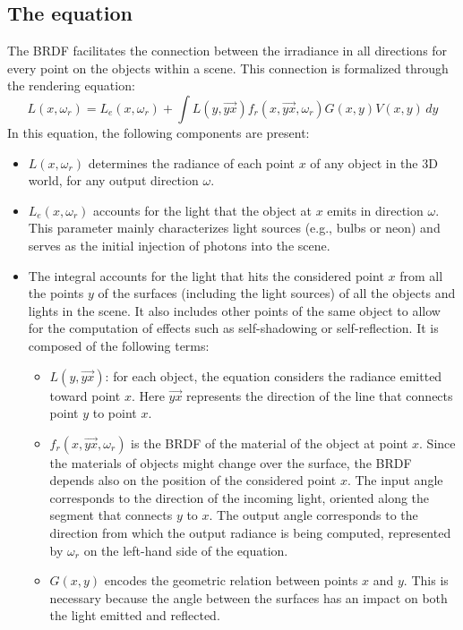 \subsection{The equation}
The BRDF facilitates the connection between the irradiance in all directions for every point on the objects within a scene. 
This connection is formalized through the rendering equation:
\[L(x,\omega_r)=L_e(x,\omega_r)+\int L(y,\overrightarrow{yx}) f_r(x,\overrightarrow{yx},\omega_r)G(x,y)V(x,y)\, dy\]
In this equation, the following components are present:
\begin{itemize}
    \item $L(x,\omega_r)$ determines the radiance of each point $x$ of any object in the 3D world, for any output direction $\omega$.
    \item $L_e(x,\omega_r)$ accounts for the light that the object at $x$ emits in direction $\omega$. 
        This parameter mainly characterizes light sources (e.g., bulbs or neon) and serves as the initial injection of photons into the scene.
    \item The integral accounts for the light that hits the considered point $x$ from all the points $y$ of the surfaces (including the light sources) of all the objects and lights in the scene. 
        It also includes other points of the same object to allow for the computation of effects such as self-shadowing or self-reflection. 
        It is composed of the following terms:
        \begin{itemize}
            \item $L(y,\overrightarrow{yx})$: for each object, the equation considers the radiance emitted toward point $x$. 
                Here $\overrightarrow{yx}$ represents the direction of the line that connects point $y$ to point $x$.
            \item $f_r(x,\overrightarrow{yx},\omega_r)$ is the BRDF of the material of the object at point $x$. 
                Since the materials of objects might change over the surface, the BRDF depends also on the position of the considered point $x$. 
                The input angle corresponds to the direction of the incoming light, oriented along the segment that connects $y$ to $x$. 
                The output angle corresponds to the direction from which the output radiance is being computed, represented by $\omega_r$ on the left-hand side of the equation.
            \item $G(x,y)$ encodes the geometric relation between points $x$ and $y$. 
                This is necessary because the angle between the surfaces has an impact on both the light emitted and reflected. 

\end{itemize}
\end{itemize}
